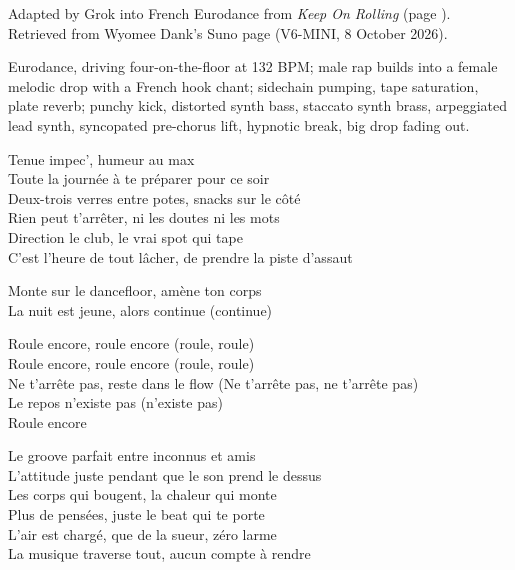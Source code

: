
\begin{notes}
Adapted by Grok into French Eurodance from \emph{Keep On Rolling} (page \pageref{sec:keep-on-rolling}). Retrieved from Wyomee Dank's Suno page (V6-MINI, 8 October 2026).
\end{notes}
\begin{style}
Eurodance, driving four-on-the-floor at 132 BPM; male rap builds into a female melodic drop with a French hook chant; sidechain pumping, tape saturation, plate reverb; punchy kick, distorted synth bass, staccato synth brass, arpeggiated lead synth, syncopated pre-chorus lift, hypnotic break, big drop fading out.
\end{style}
\begin{lyrics}
Tenue impec’, humeur au max\\
Toute la journée à te préparer pour ce soir\\
Deux-trois verres entre potes, snacks sur le côté\\
Rien peut t’arrêter, ni les doutes ni les mots\\
Direction le club, le vrai spot qui tape\\
C’est l’heure de tout lâcher, de prendre la piste d’assaut

Monte sur le dancefloor, amène ton corps\\
La nuit est jeune, alors continue (continue)

Roule encore, roule encore (roule, roule)\\
Roule encore, roule encore (roule, roule)\\
Ne t’arrête pas, reste dans le flow
(Ne t’arrête pas, ne t’arrête pas)\\
Le repos n’existe pas (n’existe pas)\\
Roule encore

Le groove parfait entre inconnus et amis\\
L’attitude juste pendant que le son prend le dessus\\
Les corps qui bougent, la chaleur qui monte\\
Plus de pensées, juste le beat qui te porte\\
L’air est chargé, que de la sueur, zéro larme\\
La musique traverse tout, aucun compte à rendre


\end{lyrics}

